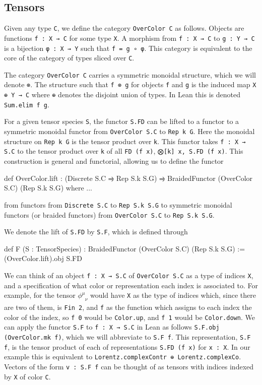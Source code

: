 \documentclass[a4paper, 11pt]{article}
\DeclareRobustCommand{\myinline}{\lstinline}
\begin{document}
\subsection{Tensors} 

Given any type \myinline|C|, we define the category \myinline|OverColor C| as follows. 
Objects are functions \myinline|f : X → C| for some type \myinline|X|. A morphism from
\myinline|f : X → C| to \myinline|g : Y → C| is a bijection
\myinline|φ : X → Y| such that \myinline|f = g ∘ φ|. This category is equivalent to the core of the
category of types sliced over \myinline|C|. 

The category \myinline|OverColor C| carries a symmetric monoidal structure,
which we will denote \myinline|⊗|. The structure such that \myinline|f ⊗ g| for objects \myinline|f| and \myinline|g|
is the induced map \myinline|X ⊕ Y → C| where \myinline|⊕| denotes the disjoint union of types.
In Lean this is denoted \myinline|Sum.elim f g|. 

For a given tensor species \myinline|S|, the functor \myinline|S.FD| can be lifted to a functor
to a symmetric monoidal functor from \myinline|OverColor S.C| to \myinline|Rep k G|.
Here the monoidal structure on \myinline|Rep k G| is the tensor product over \myinline|k|.
This functor takes \myinline|f : X → S.C| to the tensor product over \myinline|k| of all \myinline|FD (f x)|,
\myinline|⨂[k] x, S.FD (f x)|. 
This construction is general and functorial, allowing us to define the functor 
\begin{code}
def OverColor.lift : (Discrete S.C ⥤ Rep S.k S.G) ⥤ BraidedFunctor (OverColor S.C) (Rep S.k S.G) where ...
\end{code}
from functors from \myinline|Discrete S.C| to \myinline|Rep S.k S.G|
to symmetric monoidal functors (or braided functors)  from \myinline|OverColor S.C| to \myinline|Rep S.k S.G|.

We denote the lift of \myinline|S.FD| by \myinline|S.F|, which is defined through
\begin{code}
def F  (S : TensorSpecies) : BraidedFunctor (OverColor S.C) (Rep S.k S.G) := 
  (OverColor.lift).obj S.FD
\end{code}

We can think of an object \myinline|f : X → S.C| of \myinline|OverColor S.C| as a type of indices \myinline|X|,
and a specification of what color or representation each index is associated to. 
For example, for the tensor $\phi^{\mu}_{\phantom{\mu}\nu}$ would have \myinline|X| as the type of indices which, since there are two of them, 
is \myinline|Fin 2|, and \myinline|f| as the function which assigns to each index the color of the index, 
so \myinline|f 0| would be \myinline|Color.up|, and \myinline|f 1| would be \myinline|Color.down|. 
We can apply the functor \myinline|S.F| to \myinline|f : X → S.C| in Lean as follows 
\myinline|S.F.obj (OverColor.mk f)|, which we will abbreviate to \myinline|S.F f|.
This representation, \myinline|S.F f|, is the tensor product of each of representations \myinline|S.FD (f x)| for \myinline|x : X|. 
In our example this is equivalent to \myinline|Lorentz.complexContr ⊕ Lorentz.complexCo|. Vectors of the form
\myinline|v : S.F f| can be thought of as tensors with indices indexed by \myinline|X| of color \myinline|C|. 
\end{document}
